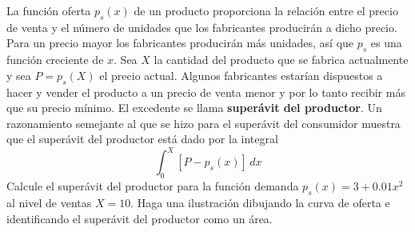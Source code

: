 \item La función oferta $p_s(x)$ de un producto proporciona la relación entre el precio de venta y el número de unidades que los fabricantes producirán a dicho precio. Para un precio mayor los fabricantes producirán más unidades, así que $p_s$ es una función creciente de $x$. Sea $X$ la cantidad del producto que se fabrica actualmente y sea $P = p_s(X)$ el precio actual. Algunos fabricantes estarían dispuestos a hacer y vender el producto a un precio de venta menor y por lo tanto recibir más que su precio mínimo. El excedente se llama \textbf{superávit del productor}. Un razonamiento semejante al que se hizo para el superávit del consumidor muestra que el superávit del productor está dado por la integral
    \[ \int_0^X [P - p_s(x)] \, dx \]
    Calcule el superávit del productor para la función demanda $p_s(x) = 3 + 0.01x^2$ al nivel de ventas $X = 10$. Haga una ilustración dibujando la curva de oferta e identificando el superávit del productor como un área.
